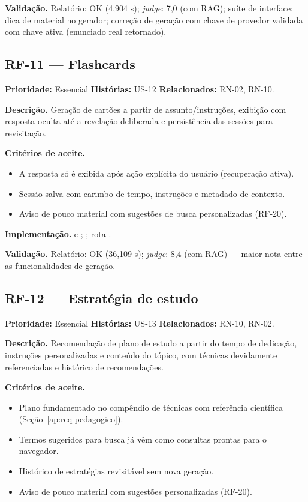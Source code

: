 \textbf{Validação.} Relatório: \texttt{} OK (4,904 s); \emph{judge}: 7,0 (com RAG); suíte de interface: dica de material no gerador; correção de geração com chave de provedor validada com chave ativa (enunciado real retornado).

\subsection{RF-11 --- Flashcards}

\textbf{Prioridade:} Essencial \quad \textbf{Histórias:} US-12 \quad \textbf{Relacionados:} RN-02, RN-10.

\textbf{Descrição.} Geração de cartões a partir de assunto/instruções, exibição com resposta oculta até a revelação deliberada e persistência das sessões para revisitação.

\textbf{Critérios de aceite.}
\begin{itemize}
    \item A resposta só é exibida após ação explícita do usuário (recuperação ativa).
    \item Sessão salva com carimbo de tempo, instruções e metadado de contexto.
    \item Aviso de pouco material com sugestões de busca personalizadas (RF-20).
\end{itemize}

\textbf{Implementação.}  e ; \texttt{}; rota \texttt{}.

\textbf{Validação.} Relatório: \texttt{} OK (36,109 s); \emph{judge}: 8,4 (com RAG) --- maior nota entre as funcionalidades de geração.

\subsection{RF-12 --- Estratégia de estudo}

\textbf{Prioridade:} Essencial \quad \textbf{Histórias:} US-13 \quad \textbf{Relacionados:} RN-10, RN-02.

\textbf{Descrição.} Recomendação de plano de estudo a partir do tempo de dedicação, instruções personalizadas e conteúdo do tópico, com técnicas devidamente referenciadas e histórico de recomendações.

\textbf{Critérios de aceite.}
\begin{itemize}
    \item Plano fundamentado no compêndio de técnicas com referência científica (Seção~\ref{ap:req-pedagogico}).
    \item Termos sugeridos para busca já vêm como consultas prontas para o navegador.
    \item Histórico de estratégias revisitável sem nova geração.
    \item Aviso de pouco material com sugestões personalizadas (RF-20).
\end{itemize}

